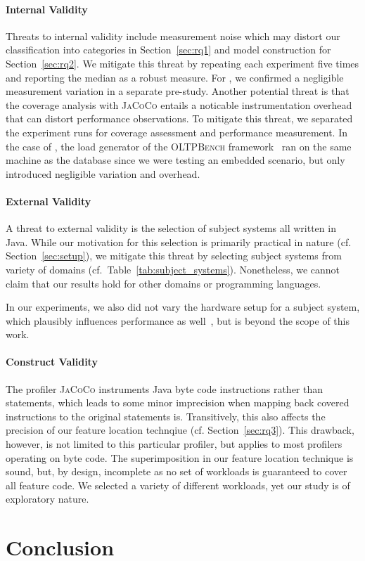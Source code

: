 \paragraph*{Internal Validity}\label{sec:internal_validity}
Threats to internal validity include measurement noise which may distort our classification into categories in Section~\ref{sec:rq1} and model construction for Section~\ref{sec:rq2}. We mitigate this threat by repeating each experiment five times and reporting the median as a robust measure. For \htwo, we confirmed a negligible measurement variation in a separate pre-study.
Another potential threat is that the coverage analysis with \mbox{\textsc{JaCoCo}} entails a noticable instrumentation overhead that can distort performance observations. To mitigate this threat, we separated the experiment runs for coverage assessment and performance measurement. In the case of \htwo, the load generator of the \textsc{OLTPBench} framework~\cite{difallah_oltp_2013} ran on the same machine as the database since we were testing an embedded scenario, but only introduced negligible variation and overhead.

\paragraph*{External Validity}\label{sec:external_validity}
A threat to external validity is the selection of subject systems all written in Java. While our motivation for this selection is primarily practical in nature (cf. Section~\ref{sec:setup}), we mitigate this threat by selecting subject systems from variety of domains (cf.~Table~\ref{tab:subject_systems}). Nonetheless, we cannot claim that our results hold for other domains or programming languages. 

In our experiments, we also did not vary the hardware setup for a subject system, which plausibly influences performance as well~\cite{ding_bayesian_2020}, but is beyond the scope of this work. 

\paragraph{Construct Validity}\label{sec:construct_validity}
The profiler \textsc{JaCoCo} instruments Java byte code instructions rather than statements, which leads to some minor imprecision when mapping back covered instructions to the original statements is. Transitively, this also affects the precision of our feature location technqiue (cf. Section~\ref{sec:rq3}). This drawback, however, is not limited to this particular profiler, but applies to most profilers operating on byte code. 
The superimposition in our feature location technique is sound, but, by design, incomplete as no set of workloads is guaranteed to cover all feature code. We selected a variety of different workloads, yet our study is of exploratory nature.


\section{Conclusion}
